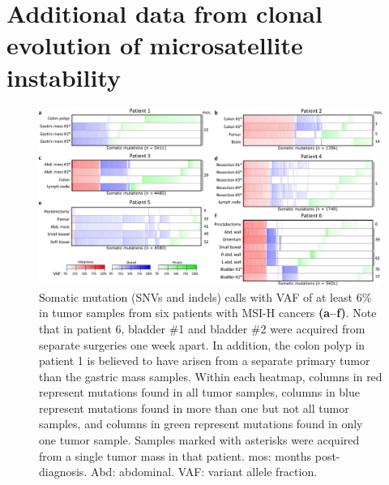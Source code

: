 \chapter{Additional data from clonal evolution of microsatellite instability}
\label{app.msiclones}

\begin{figure}[htp]
	\begin{center}
		\includegraphics[width=0.98\linewidth]{images/msiclones/supp_mutations_by_sample}
	\end{center}
	\caption[Somatic mutations called with VAF \textgreater{}~6\% in at least one tumor sample.]{Somatic mutation (SNVs and indels) calls with VAF of at least 6\% in tumor samples from six patients with MSI-H cancers \textbf{(a--f)}. Note that in patient 6, bladder \#1 and bladder \#2 were acquired from separate surgeries one week apart. In addition, the colon polyp in patient 1 is believed to have arisen from a separate primary tumor than the gastric mass samples. Within each heatmap, columns in red represent mutations found in all tumor samples, columns in blue represent mutations found in more than one but not all tumor samples, and columns in green represent mutations found in only one tumor sample. Samples marked with asterisks were acquired from a single tumor mass in that patient. mos: months post-diagnosis. Abd: abdominal. VAF: variant allele fraction.}
    \label{fig:msiclones:mutation_heatmaps_min0}
\end{figure}
